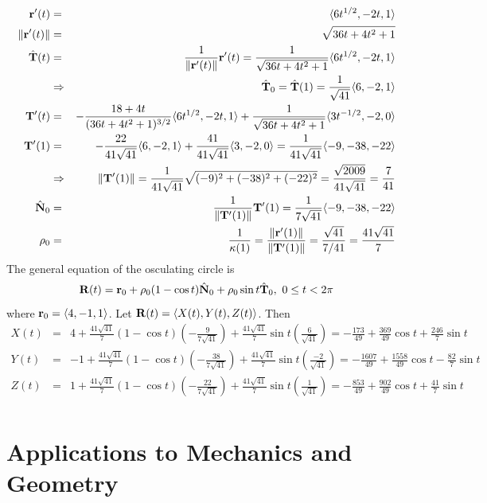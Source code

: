 \documentclass[12pt]{amsbook}
\newcommand{\la}{\langle}
\newcommand{\ra}{\rangle}
\begin{document}
\begin{eqnarray*}
{\bf r}'(t)&=&\la 6t^{1/2}, -2t, 1 \ra\\
\|{\bf r}'(t)\|&=&\sqrt{36t+4t^2+1}\\
\hat{\bf T}(t)&=&\frac{1}{\|{\bf r}'(t)\|}{\bf r}'(t)=\frac{1}{\sqrt{36t+4t^2+1}}\la 6t^{1/2},-2t,1 \ra \\
&\Rightarrow& \hat{\bf T}_0=\hat{\bf T}(1)=\frac{1}{\sqrt{41}}\la 6,-2,1 \ra \\
{\bf T}'(t)&=&-\frac{18+4t}{(36t+4t^2+1)^{3/2}}\la 6t^{1/2},-2t,1 \ra+\frac{1}{\sqrt{36t+4t^2+1}}\la 3t^{-1/2},-2,0 \ra \\
{\bf T}'(1)&=&-\frac{22}{41\sqrt{41}}\la 6,-2,1 \ra + \frac{41}{41\sqrt{41}}\la 3,-2,0 \ra = \frac{1}{41\sqrt{41}}\la -9,-38,-22\ra \\
&\Rightarrow& \|{\bf T}'(1)\|=\frac{1}{41\sqrt{41}}\sqrt{(-9)^2+(-38)^2+(-22)^2}=\frac{\sqrt{2009}}{41\sqrt{41}}=\frac{7}{41}\\
\hat{\bf N}_0&=&\frac{1}{\|{\bf T}'(1)\|}{\bf T}'(1)=\frac{1}{7\sqrt{41}}\la -9,-38,-22 \ra \\
\rho_0&=&\frac{1}{\kappa(1)}=\frac{\|{\bf r}'(1)\|}{\|{\bf T}'(1)\|}=\frac{\sqrt{41}}{7/41}=\frac{41\sqrt{41}}{7}
\end{eqnarray*}
The general equation of the osculating circle is
$${\bf R}(t)={\bf r}_0+\rho_0(1-\cos t)\hat{\bf N}_0+\rho_0\sin t\hat{\bf T}_0, \ 0\leq t <2\pi$$
where ${\bf r}_0=\la 4,-1,1 \ra$. Let ${\bf R}(t)=\la X(t), Y(t), Z(t) \ra$. Then
\begin{eqnarray*}
X(t)&=&4+\frac{41\sqrt{41}}{7}(1-\cos t)(-\frac{9}{7\sqrt{41}})+\frac{41\sqrt{41}}{7}\sin t(\frac{6}{\sqrt{41}})=-\frac{173}{49}+\frac{369}{49}\cos t +\frac{246}{7}\sin t \\
Y(t)&=&-1+\frac{41\sqrt{41}}{7}(1-\cos t)(-\frac{38}{7\sqrt{41}})+\frac{41\sqrt{41}}{7}\sin t(\frac{-2}{\sqrt{41}})=-\frac{1607}{49}+\frac{1558}{49}\cos t -\frac{82}{7}\sin t \\
Z(t)&=&1+\frac{41\sqrt{41}}{7}(1-\cos t)(-\frac{22}{7\sqrt{41}})+\frac{41\sqrt{41}}{7}\sin t(\frac{1}{\sqrt{41}})=-\frac{853}{49}+\frac{902}{49}\cos t +\frac{41}{7}\sin t \\
\end{eqnarray*}


\newpage
\section{Applications to Mechanics and Geometry}
\end{document}
